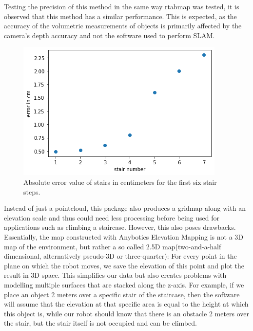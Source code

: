 \documentclass{article}
\begin{document}
Testing the precision of this method in the same way rtabmap was tested, it is observed that this method has a similar performance. This is expected, as the accuracy of the volumetric measurements of objects is primarily affected by the camera's depth accuracy and not the software used to perform SLAM.

\begin{figure}[h] %
    \centering
	\includegraphics[width=\textwidth,height=\textheight,keepaspectratio]{report1-img018.png} %
	\caption{Absolute error value of stairs in centimeters for the first six stair steps. }
\end{figure}

Instead of just a pointcloud, this package also produces a gridmap along with an elevation scale and thus could need less processing before being used for applications such as climbing a staircase. However, this also poses drawbacks. Essentially, the map constructed with Anybotics Elevation Mapping is not a 3D map of the environment, but rather a so called 2.5D map(two-and-a-half dimensional, alternatively pseudo-3D or three-quarter): For every point in the plane on which the robot moves, we save the elevation of this point and plot the result in 3D space. This simplifies our data but also creates problems with modelling multiple surfaces that are stacked along the z-axis. For example, if we place an object 2 meters over a specific stair of the staircase, then the software will assume that the elevation at that specific area is equal to the height at which this object is, while our robot should know that there is an obstacle 2 meters over the stair, but the stair itself is not occupied and can be climbed.
\end{document}
